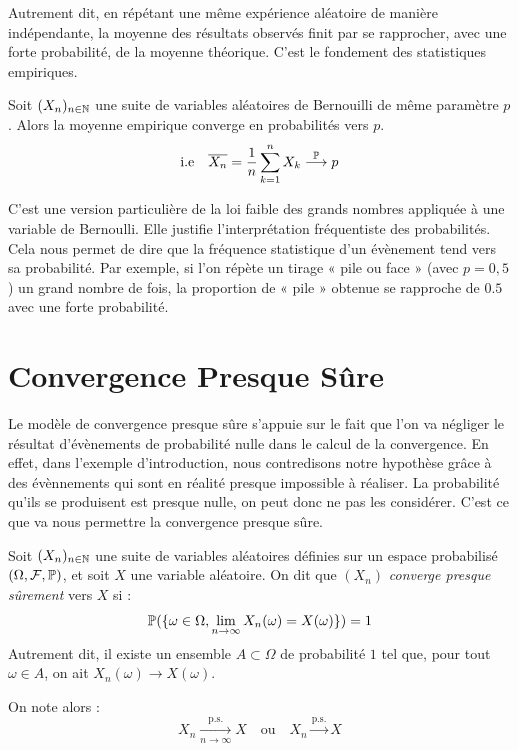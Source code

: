 Autrement dit, en répétant une même expérience aléatoire de manière indépendante, la moyenne des résultats 
observés finit par se rapprocher, avec une forte probabilité, de la moyenne théorique. 
C’est le fondement des statistiques empiriques.

\begin{corollary}
    Soit $(X_n)_{n \in \mathbb{N}}$ une suite de variables aléatoires de Bernouilli de même paramètre $p$. 
    Alors la moyenne empirique converge en probabilités vers $p$. 
    \[ \text{i.e} \quad \overline{X_n} = \frac{1}{n} \sum_{k=1}^{n} X_k \overset{\mathbb{P}}{\longrightarrow} p \] 
\end{corollary}



C’est une version particulière de la loi faible des grands nombres appliquée à une variable de Bernoulli. 
Elle justifie l’interprétation fréquentiste des probabilités. Cela nous permet de dire que la fréquence statistique d'un évènement tend vers sa probabilité. 
Par exemple, si l’on répète un tirage « pile ou face » (avec $p = 0{,}5$) un grand nombre de fois, 
la proportion de « pile » obtenue se rapproche de $0.5$ avec une forte probabilité.



\section{Convergence Presque Sûre}

Le modèle de convergence presque sûre s'appuie sur le fait que l'on va négliger le résultat d'évènements de 
probabilité nulle dans le calcul de la convergence. 
En effet, dans l'exemple d'introduction, nous contredisons notre hypothèse grâce à des évènnements qui sont 
en réalité presque impossible à réaliser. La probabilité qu'ils se produisent est presque nulle, on peut donc 
ne pas les considérer. C'est ce que va nous permettre la convergence presque sûre. 

\begin{definition}
    Soit $(X_n)_{n \in \mathbb{N}}$ une suite de variables aléatoires définies sur un espace probabilisé $(\Omega, \mathcal{F}, \mathbb{P})$, et soit $X$ une variable aléatoire.
    On dit que $(X_n)$ \emph{converge presque sûrement} vers $X$ si :
    \[ \mathbb{P}(\{ \omega \in \Omega, \lim_{n\to\infty} X_n(\omega) = X(\omega)\}) = 1\] 
    Autrement dit, il existe un ensemble $A \subset \Omega$ de probabilité $1$ tel que, pour tout $\omega \in A$, on ait $X_n(\omega) \to X(\omega)$.

    On note alors : \[ X_n \xrightarrow[n \to \infty]{\text{p.s.}} X \quad \text{ou} \quad X_n \overset{\text{p.s.}}{\longrightarrow} X \]
\end{definition}

